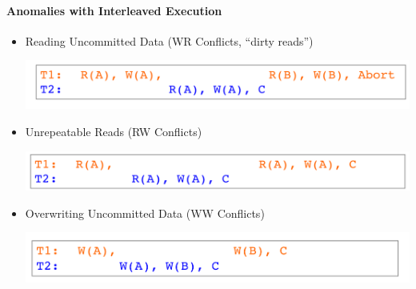 \paragraph{Anomalies with Interleaved Execution}
\begin{itemize}
\item Reading Uncommitted Data (WR Conflicts, ``dirty reads'')

  \includegraphics[scale=0.15]{graphics/WR-conflicts.png}

\item Unrepeatable Reads (RW Conflicts)

  \includegraphics[scale=0.15]{graphics/RW-conflicts.png}

\item Overwriting Uncommitted Data (WW Conflicts)

  \includegraphics[scale=0.15]{graphics/WW-conflicts.png}

\end{itemize}

